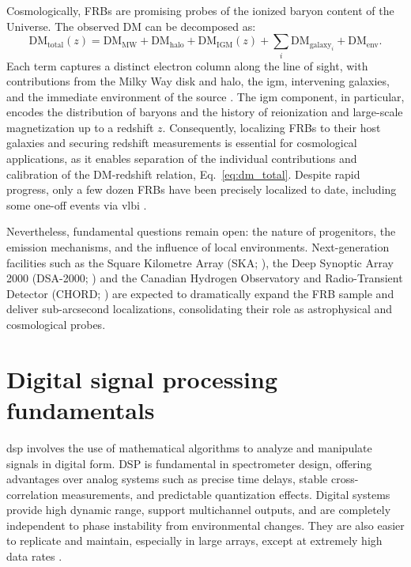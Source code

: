 Cosmologically, FRBs are promising probes of the ionized baryon content of the Universe. The observed DM can be decomposed as:
\begin{equation}
	\mathrm{DM}_{\text{total}}(z) = \mathrm{DM}_{\text{MW}} + \mathrm{DM}_{\text{halo}} + \mathrm{DM}_{\text{IGM}}(z) + \sum_i \mathrm{DM}_{\text{galaxy}_i} + \mathrm{DM}_{\text{env}} .
	\label{eq:dm_total}
\end{equation}
Each term captures a distinct electron column along the line of sight, with contributions from the Milky Way disk and halo, the \gls{igm}, intervening galaxies, and the immediate environment of the source \citep{Macquart_2020}. The \gls{igm} component, in particular, encodes the distribution of baryons and the history of reionization and large-scale magnetization up to a redshift $z$. Consequently, localizing FRBs to their host galaxies and securing redshift measurements is essential for cosmological applications, as it enables separation of the individual contributions and calibration of the DM-redshift relation, Eq.\ \ref{eq:dm_total}. Despite rapid progress, only a few dozen FRBs have been precisely localized to date, including some one-off events via \gls{vlbi} \citep{Cassanelli_2024, 2025ApJS..280....6C}.


Nevertheless, fundamental questions remain open: the nature of progenitors, the emission mechanisms, and the influence of local environments. Next-generation facilities such as the Square Kilometre Array (SKA; \citealt{Weltman_2020}), the Deep Synoptic Array 2000 (DSA-2000; \citealt{hallinan2019dsa2000radiosurvey}) and the Canadian Hydrogen Observatory and Radio-Transient Detector (CHORD; \citealt{CHORD}) are expected to dramatically expand the FRB sample and deliver sub-arcsecond localizations, consolidating their role as astrophysical and cosmological probes.


\section{Digital signal processing fundamentals}
\Gls{dsp} involves the use of mathematical algorithms to analyze and manipulate signals in digital form. DSP is fundamental in spectrometer design, offering advantages over analog systems such as precise time delays, stable cross-correlation measurements, and predictable quantization effects. Digital systems provide high dynamic range, support multichannel outputs, and are completely independent to phase instability from environmental changes. They are also easier to replicate and maintain, especially in large arrays, except at extremely high data rates \citep[see][Chapter 8]{thompson2017interferometry}.


